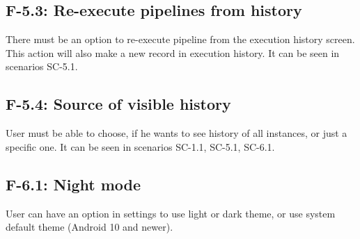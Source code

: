 \subsection*{F-5.3: Re-execute pipelines from history}
There must be an option to re-execute pipeline from the execution history screen. This action will also make a new record in execution history. It can be seen in scenarios SC-5.1.
\subsection*{F-5.4: Source of visible history}
User must be able to choose, if he wants to see history of all instances, or just a specific one. It can be seen in scenarios SC-1.1, SC-5.1, SC-6.1.
\subsection*{F-6.1: Night mode}
User can have an option in settings to use light or dark theme, or use system default theme (Android 10 and newer).
